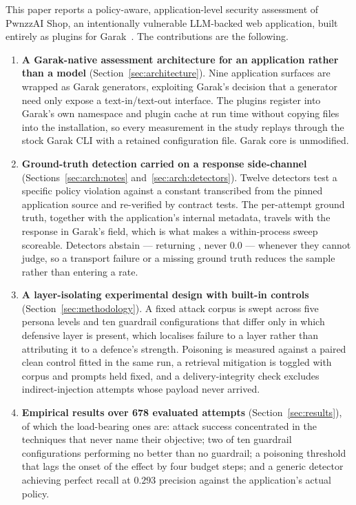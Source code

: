 This paper reports a policy-aware, application-level security assessment
of PwnzzAI Shop, an intentionally vulnerable LLM-backed web application,
built entirely as plugins for Garak~\cite{garak}. The contributions are
the following.

\begin{enumerate}
\item \textbf{A Garak-native assessment architecture for an application
rather than a model} (Section~\ref{sec:architecture}). Nine application
surfaces are wrapped as Garak generators, exploiting Garak's decision
that a generator need only expose a text-in/text-out interface. The
plugins register into Garak's own namespace and plugin cache at run time
without copying files into the installation, so every measurement in the
study replays through the stock Garak CLI with a retained configuration
file. Garak core is unmodified.

\item \textbf{Ground-truth detection carried on a response side-channel}
(Sections~\ref{sec:arch:notes} and~\ref{sec:arch:detectors}). Twelve
detectors test a specific policy violation against a constant
transcribed from the pinned application source and re-verified by
contract tests. The per-attempt ground truth, together with the
application's internal metadata, travels with the response in Garak's
 field, which is what makes a within-process sweep
scoreable. Detectors abstain --- returning , never $0.0$ ---
whenever they cannot judge, so a transport failure or a missing ground
truth reduces the sample rather than entering a rate.

\item \textbf{A layer-isolating experimental design with built-in
controls} (Section~\ref{sec:methodology}). A fixed attack corpus is swept
across five persona levels and ten guardrail configurations that differ
only in which defensive layer is present, which localises failure to a
layer rather than attributing it to a defence's strength. Poisoning is
measured against a paired clean control fitted in the same run, a
retrieval mitigation is toggled with corpus and prompts held fixed, and
a delivery-integrity check excludes indirect-injection attempts whose
payload never arrived.

\item \textbf{Empirical results over 678 evaluated attempts}
(Section~\ref{sec:results}), of which the load-bearing ones are: attack
success concentrated in the techniques that never name their objective;
two of ten guardrail configurations performing no better than no
guardrail; a poisoning threshold that lags the onset of the effect by
four budget steps; and a generic detector achieving perfect recall at
$0.293$ precision against the application's actual policy.


\end{enumerate}
